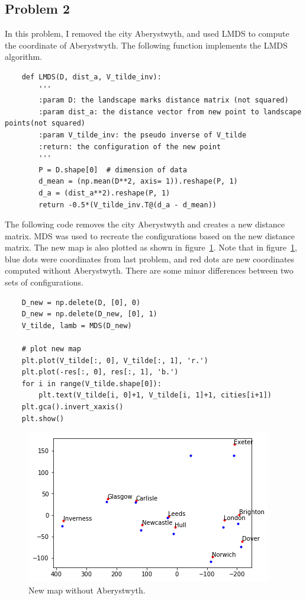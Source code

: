 \documentclass{article}
\begin{document}
\subsection*{Problem 2}
In this problem, I removed the city Aberystwyth, and used LMDS to compute the coordinate of Aberystwyth.
The following function implements the LMDS algorithm.
\begin{lstlisting}
	def LMDS(D, dist_a, V_tilde_inv):
		'''
		:param D: the landscape marks distance matrix (not squared)
		:param dist_a: the distance vector from new point to landscape points(not squared)
		:param V_tilde_inv: the pseudo inverse of V_tilde
		:return: the configuration of the new point
		'''
		P = D.shape[0]  # dimension of data
		d_mean = (np.mean(D**2, axis= 1)).reshape(P, 1)
		d_a = (dist_a**2).reshape(P, 1)
		return -0.5*(V_tilde_inv.T@(d_a - d_mean))
\end{lstlisting}
The following code removes the city Aberystwyth and creates a new distance matrix. MDS was used to recreate the configurations based on the new distance matrix. The new map is also plotted as shown in figure~\ref{fig:new_map}. Note that in figure~\ref{fig:new_map}, blue dots were coordinates from last problem, and red dots are new coordinates computed without Aberystwyth. There are some minor differences between two sets of configurations. 
\begin{lstlisting}
	D_new = np.delete(D, [0], 0)
	D_new = np.delete(D_new, [0], 1)
	V_tilde, lamb = MDS(D_new)
	
	# plot new map
	plt.plot(V_tilde[:, 0], V_tilde[:, 1], 'r.')
	plt.plot(-res[:, 0], res[:, 1], 'b.')
	for i in range(V_tilde.shape[0]):
		plt.text(V_tilde[i, 0]+1, V_tilde[i, 1]+1, cities[i+1])
	plt.gca().invert_xaxis()
	plt.show()
\end{lstlisting}

\begin{figure}[h!]
\centering
\includegraphics[width=0.6\linewidth]{../images/3.png}
\caption{New map without Aberystwyth.}
\label{fig:new_map}
\end{figure}
\end{document}
